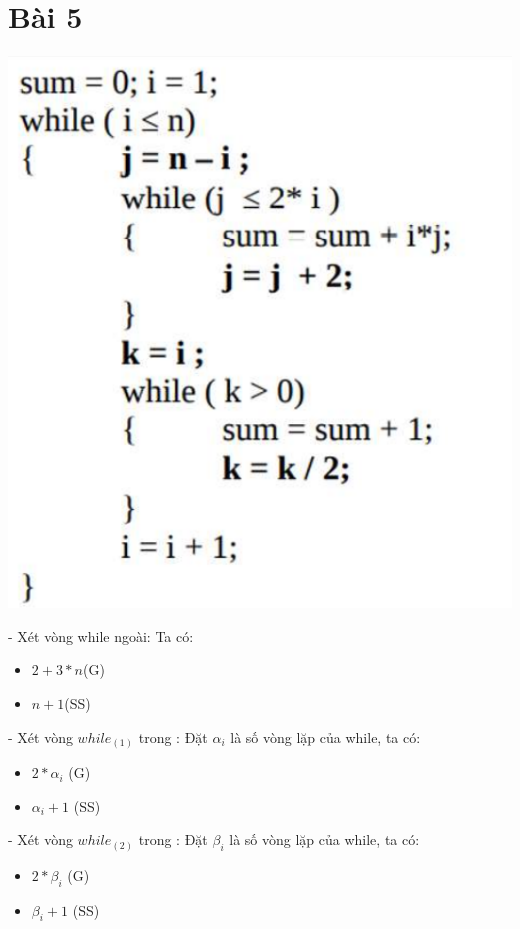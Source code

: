 \documentclass{article}
\begin{document}
\section*{Bài 5}
\includegraphics[scale=0.5]{bai5}

- Xét vòng while ngoài:
Ta có:
\begin{itemize}
    \item $ 2 + 3*n $(G)
    \item $ n + 1 $(SS)
\end{itemize}

- Xét vòng $while_{(1)}$ trong :
Đặt $\alpha_{i}$ là số vòng lặp của while, ta có:
\begin{itemize}
    \item $ 2*\alpha_{i}$ (G)
    \item $ \alpha_{i} + 1$ (SS)
\end{itemize}

\vspace{15mm}

- Xét vòng $while_{(2)}$ trong :
Đặt $\beta_{i}$ là số vòng lặp của while, ta có:
\begin{itemize}
    \item $ 2*\beta_{i}$ (G)
    \item $ \beta_{i} + 1$ (SS)
\end{itemize}
\end{document}
